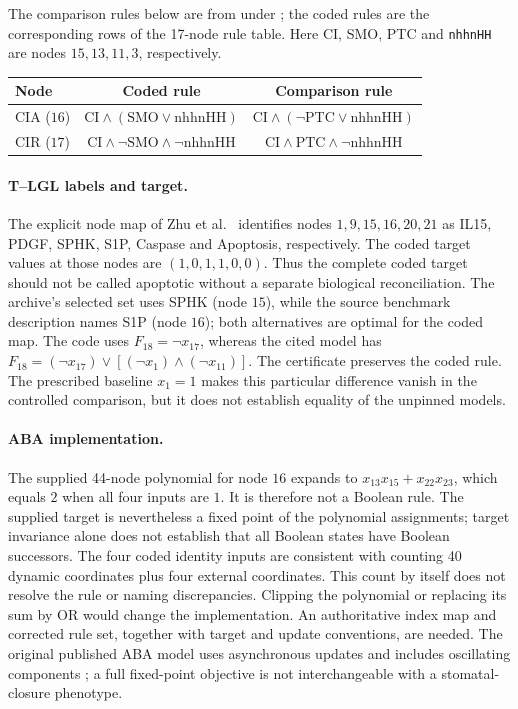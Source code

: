 The comparison rules below are from
under ; the coded rules are the corresponding rows
of the 17-node rule table. Here CI, SMO, PTC and \texttt{nhhnHH}
are nodes $15,13,11,3$, respectively.
\begin{center}\small
\begin{tabular}{@{}lcc@{}}
\toprule
Node & Coded rule & Comparison rule\\
\midrule
CIA ($16$) & $\mathrm{CI}\wedge(\mathrm{SMO}\vee\mathrm{nhhnHH})$
 & $\mathrm{CI}\wedge(\neg\mathrm{PTC}\vee\mathrm{nhhnHH})$\\
CIR ($17$) & $\mathrm{CI}\wedge\neg\mathrm{SMO}\wedge\neg\mathrm{nhhnHH}$
 & $\mathrm{CI}\wedge\mathrm{PTC}\wedge\neg\mathrm{nhhnHH}$\\
\bottomrule
\end{tabular}
\end{center}

\paragraph{T--LGL labels and target.}
\label{bio:fas-variant}
The explicit node map of Zhu et al.\ \cite[Eq.~(17), p.~184]{Zhu2024}
identifies nodes $1,9,15,16,20,21$ as IL15, PDGF, SPHK, S1P,
Caspase and Apoptosis, respectively. The coded target values at those
nodes are $(1,0,1,1,0,0)$. Thus the complete coded target should not be
called apoptotic without a separate biological reconciliation.
The archive's selected set uses SPHK (node $15$), while the source benchmark description names S1P (node $16$); both alternatives are optimal for
the coded map. The code uses $F_{18}=\neg x_{17}$, whereas the cited
model has $F_{18}=(\neg x_{17})\vee[(\neg x_1)\wedge(\neg x_{11})]$.
The certificate preserves the coded rule. The prescribed baseline
$x_1=1$ makes this particular difference vanish in the controlled
comparison, but it does not establish equality of the unpinned models.

\paragraph{ABA implementation.}
The supplied 44-node polynomial for node $16$ expands to
$x_{13}x_{15}+x_{22}x_{23}$, which equals $2$ when all four inputs are
$1$. It is therefore not a Boolean rule. The supplied target is nevertheless
a fixed point of the polynomial assignments; target invariance alone does
not establish that all Boolean states have Boolean successors.
The four coded identity inputs are consistent with counting 40 dynamic
coordinates plus four external coordinates. This count by itself does not
resolve the rule or naming discrepancies. Clipping the polynomial or
replacing its sum by OR would change the implementation. An authoritative
index map and corrected rule set, together with target and update
conventions, are needed. The original published ABA model uses asynchronous
updates and includes oscillating components \cite{Li2006}; a full fixed-point
objective is not interchangeable with a stomatal-closure phenotype.

